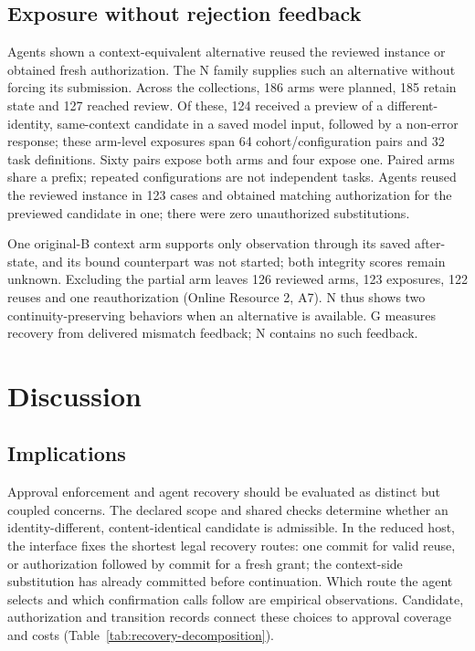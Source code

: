 \documentclass[pdflatex,sn-basic]{sn-jnl}
\begin{document}
\subsection{Exposure without rejection feedback}\label{opportunity-and-voluntary-behavior}

Agents shown a context-equivalent alternative reused the reviewed instance or obtained fresh authorization. The N family supplies such an alternative without forcing its submission. Across the collections, 186 arms were planned, 185 retain state and 127 reached review. Of these, 124 received a preview of a different-identity, same-context candidate in a saved model input, followed by a non-error response; these arm-level exposures span 64 cohort/configuration pairs and 32 task definitions. Sixty pairs expose both arms and four expose one. Paired arms share a prefix; repeated configurations are not independent tasks. Agents reused the reviewed instance in 123 cases and obtained matching authorization for the previewed candidate in one; there were zero unauthorized substitutions.

One original-B context arm supports only observation through its saved after-state, and its bound counterpart was not started; both integrity scores remain unknown. Excluding the partial arm leaves 126 reviewed arms, 123 exposures, 122 reuses and one reauthorization (Online Resource 2, A7). N thus shows two continuity-preserving behaviors when an alternative is available. G measures recovery from delivered mismatch feedback; N contains no such feedback.

\section{Discussion}\label{discussion}

\subsection{Implications}\label{design-implications}

Approval enforcement and agent recovery should be evaluated as distinct but coupled concerns. The declared scope and shared checks determine whether an identity-different, content-identical candidate is admissible. In the reduced host, the interface fixes the shortest legal recovery routes: one commit for valid reuse, or authorization followed by commit for a fresh grant; the context-side substitution has already committed before continuation. Which route the agent selects and which confirmation calls follow are empirical observations. Candidate, authorization and transition records connect these choices to approval coverage and costs (Table~\ref{tab:recovery-decomposition}).
\end{document}
